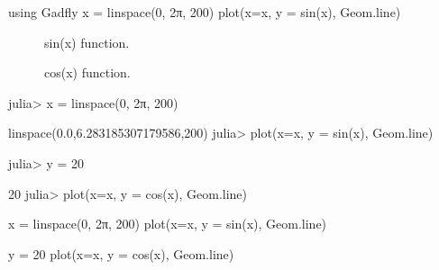 


\begin{juliacode}
using Gadfly
x = linspace(0, 2π, 200)
plot(x=x, y = sin(x), Geom.line)
\end{juliacode}
\begin{figure}[ht]
\center
\resizebox{\linewidth}{!}{}
\caption{sin(x) function.}
\label{fig:sin_fun}
\end{figure}



\begin{figure}[htpb]
\center
\resizebox{\linewidth}{!}{}
\caption{cos(x) function.}
\end{figure}



\resizebox{\linewidth}{!}{}



\begin{juliaterm}
julia> x = linspace(0, 2π, 200)

linspace(0.0,6.283185307179586,200)
julia> plot(x=x, y = sin(x), Geom.line)

\end{juliaterm}
\resizebox{\linewidth}{!}{}

\begin{juliaterm}
julia> y = 20

20
julia> plot(x=x, y = cos(x), Geom.line)
\end{juliaterm}
\resizebox{\linewidth}{!}{}



\begin{juliacode}
x = linspace(0, 2π, 200)
plot(x=x, y = sin(x), Geom.line)

\end{juliacode}
\resizebox{15cm}{!}{}

\begin{juliacode}
y = 20
plot(x=x, y = cos(x), Geom.line)
\end{juliacode}
\resizebox{15cm}{!}{}
